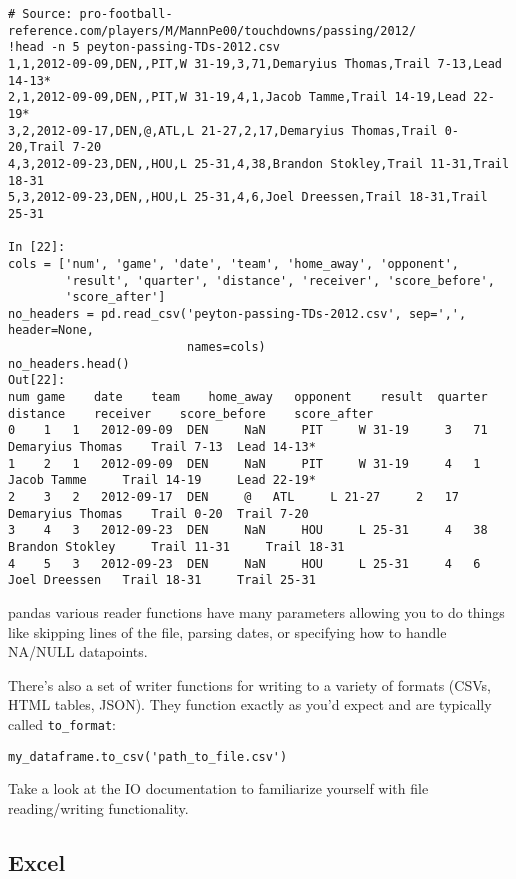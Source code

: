 \documentclass[KSmain.tex]{subfiles}
\begin{document}
\begin{framed}
\begin{verbatim}
# Source: pro-football-reference.com/players/M/MannPe00/touchdowns/passing/2012/
!head -n 5 peyton-passing-TDs-2012.csv
1,1,2012-09-09,DEN,,PIT,W 31-19,3,71,Demaryius Thomas,Trail 7-13,Lead 14-13*
2,1,2012-09-09,DEN,,PIT,W 31-19,4,1,Jacob Tamme,Trail 14-19,Lead 22-19*
3,2,2012-09-17,DEN,@,ATL,L 21-27,2,17,Demaryius Thomas,Trail 0-20,Trail 7-20
4,3,2012-09-23,DEN,,HOU,L 25-31,4,38,Brandon Stokley,Trail 11-31,Trail 18-31
5,3,2012-09-23,DEN,,HOU,L 25-31,4,6,Joel Dreessen,Trail 18-31,Trail 25-31

In [22]:
cols = ['num', 'game', 'date', 'team', 'home_away', 'opponent',
        'result', 'quarter', 'distance', 'receiver', 'score_before',
        'score_after']
no_headers = pd.read_csv('peyton-passing-TDs-2012.csv', sep=',', header=None,
                         names=cols)
no_headers.head()
Out[22]:
num	game	date	team	home_away	opponent	result	quarter	distance	receiver	score_before	score_after
0	 1	 1	 2012-09-09	 DEN	 NaN	 PIT	 W 31-19	 3	 71	 Demaryius Thomas	 Trail 7-13	 Lead 14-13*
1	 2	 1	 2012-09-09	 DEN	 NaN	 PIT	 W 31-19	 4	 1	 Jacob Tamme	 Trail 14-19	 Lead 22-19*
2	 3	 2	 2012-09-17	 DEN	 @	 ATL	 L 21-27	 2	 17	 Demaryius Thomas	 Trail 0-20	 Trail 7-20
3	 4	 3	 2012-09-23	 DEN	 NaN	 HOU	 L 25-31	 4	 38	 Brandon Stokley	 Trail 11-31	 Trail 18-31
4	 5	 3	 2012-09-23	 DEN	 NaN	 HOU	 L 25-31	 4	 6	 Joel Dreessen	 Trail 18-31	 Trail 25-31
\end{verbatim}
\end{framed}
pandas various reader functions have many parameters allowing you to do things like skipping lines of the file, parsing dates, or specifying how to handle NA/NULL datapoints.

There's also a set of writer functions for writing to a variety of formats (CSVs, HTML tables, JSON). They function exactly as you'd expect and are typically called \texttt{to\_format}:
\begin{framed}
\begin{verbatim}
my_dataframe.to_csv('path_to_file.csv')
\end{verbatim}
\end{framed}
Take a look at the IO documentation to familiarize yourself with file reading/writing functionality.
\subsection{Excel}
\end{document}
